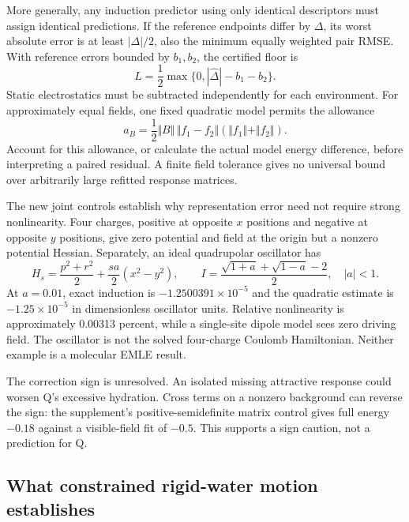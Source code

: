 \documentclass{article}
\begin{document}
More generally, any induction predictor using only identical descriptors must assign identical predictions. If the reference endpoints differ by $\Delta$, its worst absolute error is at least $|\Delta|/2$, also the minimum equally weighted pair RMSE. With reference errors bounded by $b_1,b_2$, the certified floor is
\begin{equation*}
L=\frac12\max\{0,|\widehat\Delta|-b_1-b_2\}.
\end{equation*}
Static electrostatics must be subtracted independently for each environment. For approximately equal fields, one fixed quadratic model permits the allowance
\begin{equation*}
a_B=\frac12\Vert B\Vert\,\Vert f_1-f_2\Vert(\Vert f_1\Vert+\Vert f_2\Vert).
\end{equation*}
Account for this allowance, or calculate the actual model energy difference, before interpreting a paired residual. A finite field tolerance gives no universal bound over arbitrarily large refitted response matrices.

The new joint controls establish why representation error need not require strong nonlinearity. Four charges, positive at opposite $x$ positions and negative at opposite $y$ positions, give zero potential and field at the origin but a nonzero potential Hessian. Separately, an ideal quadrupolar oscillator has
\begin{equation*}
H_s=\frac{p^2+r^2}{2}+\frac{sa}{2}(x^2-y^2),\qquad
I=\frac{\sqrt{1+a}+\sqrt{1-a}-2}{2},\quad |a|<1.
\end{equation*}
At $a=0.01$, exact induction is $-1.2500391\times10^{-5}$ and the quadratic estimate is $-1.25\times10^{-5}$ in dimensionless oscillator units. Relative nonlinearity is approximately 0.00313 percent, while a single-site dipole model sees zero driving field. The oscillator is not the solved four-charge Coulomb Hamiltonian. Neither example is a molecular EMLE result.

The correction sign is unresolved. An isolated missing attractive response could worsen Q's excessive hydration. Cross terms on a nonzero background can reverse the sign: the supplement's positive-semidefinite matrix control gives full energy $-0.18$ against a visible-field fit of $-0.5$. This supports a sign caution, not a prediction for Q.

\subsection{What constrained rigid-water motion establishes}
\end{document}
